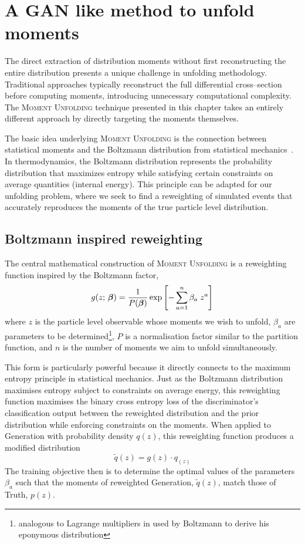 \section{A GAN like method to unfold moments}
    The direct extraction of distribution moments without first reconstructing the entire distribution presents a unique challenge in unfolding methodology.
    Traditional approaches typically reconstruct the full differential cross--section before computing moments, introducing unnecessary computational complexity.
    The \textsc{Moment Unfolding} technique presented in this chapter takes an entirely different approach by directly targeting the moments themselves.

    The basic idea underlying \textsc{Moment Unfolding} is the connection between statistical moments and the Boltzmann distribution from statistical mechanics~\cite{Boltzmann1978AbleitungLichttheorie, Sharp2015Translation1909}.
    In thermodynamics, the Boltzmann distribution represents the probability distribution that maximizes entropy while satisfying certain constraints on average quantities (internal energy). 
    This principle can be adapted for our unfolding problem, where we seek to find a reweighting of simulated events that accurately reproduces the moments of the true particle level distribution.
    \subsection{Boltzmann inspired reweighting}
        The central mathematical construction of \textsc{Moment Unfolding} is a reweighting function inspired by the Boltzmann factor,
        \[
            \label{eq:moment-generator}
            g(z;\,\vb*\beta) = \frac{1}{P(\vb*{\beta})} \exp\left[-\sum_{a=1}^n \beta_a \; z^a\right]
        \]
        where $z$ is the particle level observable whose moments we wish to unfold, $\beta_a$ are parameters to be determined\footnote{analogous to Lagrange multipliers in used by Boltzmann to derive his eponymous distribution}, $P$ is a normalisation factor similar to the partition function, and $n$ is the number of moments we aim to unfold simultaneously.

        This form is particularly powerful because it directly connects to the maximum entropy principle in statistical mechanics.
        Just as the Boltzmann distribution maximises entropy subject to constraints on average energy, this reweighting function maximises the binary cross entropy loss of the discriminator's classification output between the reweighted distribution and the prior distribution while enforcing constraints on the moments.
        When applied to Generation with probability density $q(z)$, this reweighting function produces a modified distribution
        \[
            \widetilde{q}(z) = g(z) \cdot q_(z)
        \]
        The training objective then is to determine the optimal values of the parameters $\beta_a$ such that the moments of reweighted Generation, $\widetilde{q}(z)$, match those of Truth, \(p(z)\).
    
